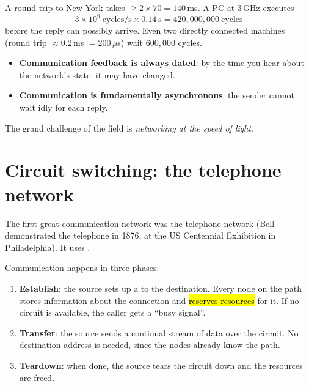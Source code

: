 \begin{example}
A round trip to New York takes $\ge2\times70 = 140$\,ms. A PC at 3\,GHz executes
\[ 3\times10^9\ \text{cycles/s}\times0.14\ \text{s} = 420{,}000{,}000\ \text{cycles} \]
before the reply can possibly arrive. Even two directly connected machines (round trip $\approx0.2$\,ms $=200\,\mu$s) wait $600{,}000$ cycles.
\end{example}

\begin{intuition}[Consequences]
\begin{itemize}
  \item \textbf{Communication feedback is always dated}: by the time you hear about the network's state, it may have changed.
  \item \textbf{Communication is fundamentally asynchronous}: the sender cannot wait idly for each reply.
\end{itemize}
The grand challenge of the field is \emph{networking at the speed of light}.
\end{intuition}

\section{Circuit switching: the telephone network}

The first great communication network was the telephone network (Bell demonstrated the telephone in 1876, at the US Centennial Exhibition in Philadelphia).
It uses .

\begin{defn}
Communication happens in three phases:
\begin{enumerate}
  \item \textbf{Establish}: the source sets up a  to the destination. Every node on the path stores information about the connection
        and \hl{reserves resources} for it. If no circuit is available, the caller gets a ``busy signal''.
  \item \textbf{Transfer}: the source sends a continual stream of data over the circuit. No destination address is needed, since the nodes already know the path.
  \item \textbf{Teardown}: when done, the source tears the circuit down and the resources are freed.
\end{enumerate}
\end{defn}

